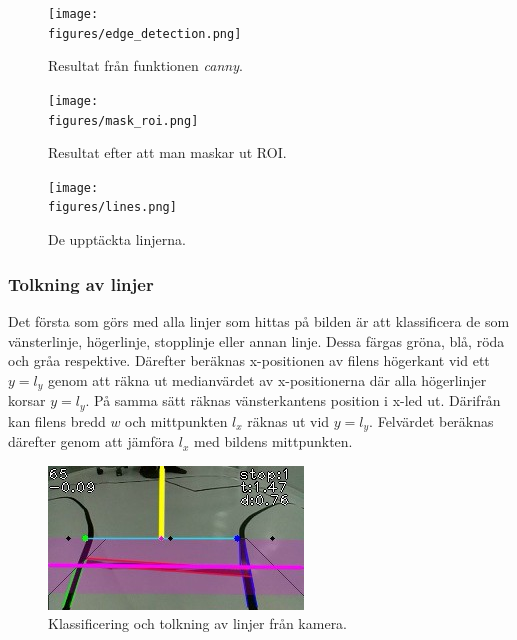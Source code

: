 \documentclass[tekniskrapport/tech.tex]{subfiles}
\begin{document}
\begin{figure}[H]
    \centering
    \texttt{[image: \\figures/edge\_detection.png]}
    \caption{Resultat från funktionen \textit{canny}.}
    \label{fig:edge_det}
\end{figure}

\begin{figure}[H]
    \centering
    \texttt{[image: \\figures/mask\_roi.png]}
    \caption{Resultat efter att man maskar ut ROI.}
    \label{fig:mask}
\end{figure}

\begin{figure}[H]
    \centering
    \texttt{[image: \\figures/lines.png]}
    \caption{De upptäckta linjerna.}
    \label{fig:lines}
\end{figure}



\subsubsection{Tolkning av linjer}
Det första som görs med alla linjer som hittas på bilden är att klassificera de
som vänsterlinje, högerlinje, stopplinje eller annan linje. Dessa färgas gröna,
blå, röda och gråa respektive. Därefter beräknas x-positionen av filens
högerkant vid ett $y=l_y$ genom att räkna ut medianvärdet av x-positionerna där
alla högerlinjer korsar $y=l_y$. På samma sätt räknas vänsterkantens position i
x-led ut. Därifrån kan filens bredd $w$ och mittpunkten $l_x$ räknas ut vid
$y=l_y$. Felvärdet beräknas därefter genom att jämföra $l_x$ med bildens
mittpunkten.

\begin{figure}
    \includegraphics[width=\linewidth]{tekniskrapport/figures/opencv.jpg}
    \caption{Klassificering och tolkning av linjer från kamera.}
\end{figure}
\end{document}
